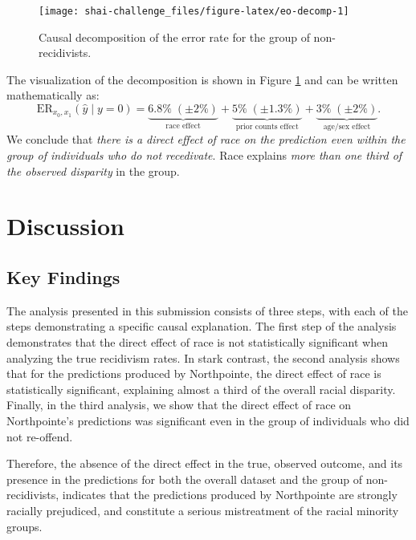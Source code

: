 \documentclass{article}
\begin{document}
\begin{figure}

{\centering \texttt{[image: shai-challenge\_files/figure-latex/eo-decomp-1]} 

}

\caption{Causal decomposition of the error rate for the group of non-recidivists.}\label{fig:eo-decomp}
\end{figure}

The visualization of the decomposition is shown in Figure
\ref{fig:eo-decomp} and can be written mathematically as:
\begin{equation}
  \text{ER}_{x_0, x_1}(\hat{y} \mid y = 0) = \underbrace{6.8\% \;(\pm 2\%)}_{\text{race effect}} +  \underbrace{5\% \;(\pm 1.3\%)}_{\text{prior counts effect}} +  \underbrace{3\%\;(\pm 2\%)}_{\text{age/sex effect}}.
\end{equation} We conclude that \emph{there is a direct effect of race
on the prediction even within the group of individuals who do not
recedivate}. Race explains \emph{more than one third of the observed
disparity} in the group.

\hypertarget{discussion}{%
\section{Discussion}\label{discussion}}

\hypertarget{key-findings}{%
\subsection{Key Findings}\label{key-findings}}

The analysis presented in this submission consists of three steps, with
each of the steps demonstrating a specific causal explanation. The first
step of the analysis demonstrates that the direct effect of race is not
statistically significant when analyzing the true recidivism rates. In
stark contrast, the second analysis shows that for the predictions
produced by Northpointe, the direct effect of race is statistically
significant, explaining almost a third of the overall racial disparity.
Finally, in the third analysis, we show that the direct effect of race
on Northpointe's predictions was significant even in the group of
individuals who did not re-offend.

Therefore, the absence of the direct effect in the true, observed
outcome, and its presence in the predictions for both the overall
dataset and the group of non-recidivists, indicates that the predictions
produced by Northpointe are strongly racially prejudiced, and constitute
a serious mistreatment of the racial minority groups.
\end{document}
